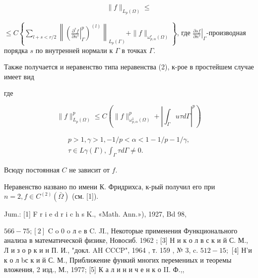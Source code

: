 \documentclass[10pt]{article}
\begin{document}
\[

\|f\|_{L_{p}(\Omega)} \leqslant

\]



$\leqslant C\left\{\sum_{l+s<r / 2}\left\|\left(\left.\frac{\partial^{s} f}{\partial n^{s}}\right|_{\Gamma} ^{p}\right)^{(l)}\right\|_{L_{p}(\Gamma)}+\|f\|_{\omega_{p, \alpha}^{r}(\Omega)}\right\}$, где $\left.\frac{\partial s f}{\partial n^{s}}\right|_{\Gamma}$-производная порядка $s$ по внутренней нормали к $\Gamma$ в точках $\Gamma$.



Также получается и неравенство типа неравенства (2), к-рое в простейшем случае имеет вид



где



\[

\|f\|_{L_{p}(\Omega)}^{p} \leqslant C\left(\|f\|_{\omega_{p, \alpha}^{1}(\Omega)}^{p}+\left|\int_{\Gamma} u \tau d \Gamma\right|^{p}\right)

\]



\[

\begin{gathered}

p>1, \gamma>1,-1 / p<\alpha<1-1 / p-1 / \gamma, \\

\tau \in L \gamma(\Gamma), \int_{\Gamma} \tau d \Gamma \neq 0 .

\end{gathered}

\]



Всюду постоянная $C$ не зависит от $f$.



Неравенство названо по имени К. Фридрихса, к-рый получил его при $n=2, f \in C^{(2)}(\bar{\Omega})$ (см. [1]).



Jum.: [1] F r i e d r i c h s K., «Math. Ann.»), 1927, Bd 98,

$566-75 ;[2]$ C o 0 o л e в C. JI., Некоторые применения Функционального анализа в математической физике, Новосиб. 1962 ; [3] Н и к о л в с к и й С. М., Л и з о р к и н П. И., "докл. AH CCCP", 1964 , т. 159 , № 3, c. $512-15 ;$ [4] Н'и к о л bс к и й С. М., Приближение функий многих перемениых и теоремы вложения, 2 изд., М., 1977; [5] К а л и н и ч е н к о II. Ф.,,
\end{document}
